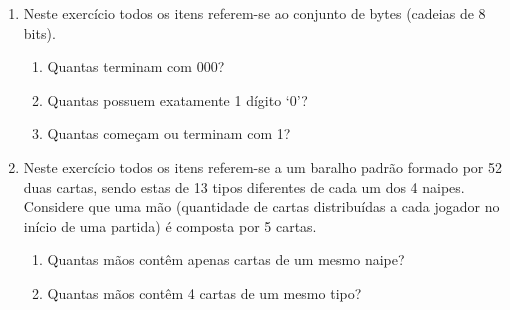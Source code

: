 \documentclass[11pt,a4paper]{report}
\begin{document}
\begin{enumerate}
	\item Neste exerc\'icio todos os itens referem-se ao conjunto de bytes (cadeias de 8 bits).
	\begin{enumerate}
		\item Quantas terminam com 000?
		\item Quantas possuem exatamente 1 d\'igito `0'?
		\item Quantas come\c{c}am ou terminam com 1?
	\end{enumerate}
	\item Neste exerc\'icio todos os itens referem-se a um baralho padr\~ao formado por 52 duas cartas, 
              sendo estas de 13 tipos diferentes de
	      cada um dos 4 naipes. Considere que uma m\~ao (quantidade de cartas distribu\'idas a cada jogador 
              no in\'icio de uma partida) \'e
	      composta por 5 cartas.
	\begin{enumerate}
		\item Quantas m\~aos cont\^em apenas cartas de um mesmo naipe?
		\item Quantas m\~aos cont\^em 4 cartas de um mesmo tipo?
	\end{enumerate}
\end{enumerate}
\end{document}
